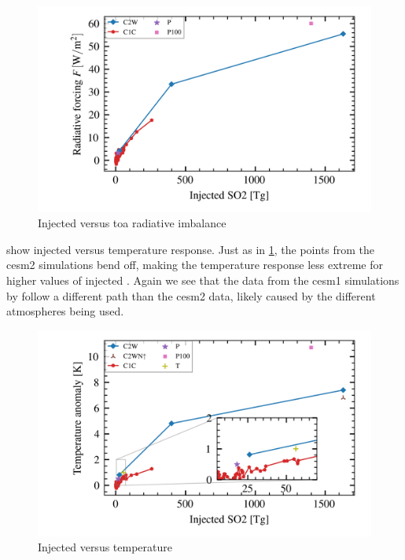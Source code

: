 \documentclass[twocol]{ametsocV5}
\newcommand{\iso}[1][i]{{#1}njected \ce{SO2}}
\begin{document}
\begin{figure}
  \begin{center}
    \includegraphics[width=0.95\linewidth]{figures/injection_vs_toa.png}
  \end{center}
  \caption{Injected  versus \acrshort{toa} radiative imbalance}%
  \label{fig:so2_vs_toa}
\end{figure}

 show \iso{} versus temperature response. Just as in
\cref{fig:so2_vs_toa}, the points from the \acrshort{cesm2} simulations bend off, making
the temperature response less extreme for higher values of \iso. Again we see that the
data from the \acrshort{cesm1} simulations by \citet{ottobliesner2016} follow a
different path than the \acrshort{cesm2} data, likely caused by the different
atmospheres being used.

\begin{figure}
  \begin{center}
    \includegraphics[width=0.95\linewidth]{figures/injection_vs_temperature.png}
  \end{center}
  \caption{Injected  versus temperature}%
  \label{fig:so2_vs_temp}
\end{figure}
\end{document}
